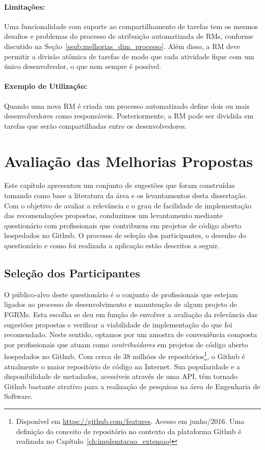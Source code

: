 \paragraph{Limitações:}
\label{par:limitacoes_s08}

Uma funcionalidade com suporte ao compartilhamento de tarefas tem os mesmos
desafios e problemas do processo de atribuição automatizada de RMs, conforme
discutido na Seção~\ref{ssub:melhorias_dim_processo}. Além disso, a RM deve
permitir a divisão atômica de tarefas de modo que cada atividade fique com um
único desenvolvedor, o que nem sempre é possível.

\paragraph{Exemplo de Utilização:}
\label{par:exemplo_de_utilização_s08}

Quando uma nova RM é criada um processo automatizado define dois ou mais
desenvolvedores como responsáveis. Posteriormente, a RM pode ser dividida em
tarefas que serão compartilhadas entre os desenvolvedores.

\section{Avaliação das Melhorias Propostas}
\label{sec:sug_melhoria_avaliacao_das_melhorias}

Este capítulo apresentou um conjunto de sugestões que foram construídas tomando
como base a literatura da área e os levantamentos desta dissertação. Com o
objetivo de avaliar a relevância e o grau de facilidade de implementação das
recomendações propostas, conduzimos um levantamento mediante questionário com
profissionais que contribuem em projetos de código aberto hospedados no Github.
O processo de seleção dos participantes, o desenho do questionário e como foi
realizada a aplicação estão descritos a seguir.

\subsection{Seleção dos Participantes}
\label{ssub:sug_melhoria_selecao_participantes}

O público-alvo deste questionário é o conjunto de profissionais que estejam
ligados ao processo de desenvolvimento e manutenção de algum projeto de FGRMs.
Esta escolha se deu em função de envolver a avaliação da relevância das
sugestões propostas e verificar a viabilidade de implementação do que foi
recomendado. Neste sentido, optamos por um amostra de conveniência composta por
profissionais que atuam como \textit{contribuidores} em projetos de código
aberto hospedados no Github. Com cerca de 38 milhões de
repositórios\footnote{Disponível em \url{https://github.com/features}. Acesso
    em junho/2016. Uma definição do conceito de repositório no contexto da
    plataforma Github é realizada no Capítulo~\ref{ch:implemtacao_extensao}}, o
Github é atualmente o maior repositório de código na Internet. Sua popularidade
e a disponibilidade de metadados, acessíveis através de uma API, têm tornado
Github bastante atrativo para a realização de pesquisas na área de Engenharia
de Software.

